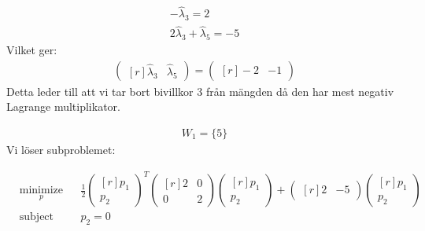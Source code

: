 \begin{equation*}
\begin{aligned}
-\hat{\lambda}_3=2 \\
2\hat{\lambda}_3+\hat{\lambda}_5=-5
\end{aligned}
\end{equation*}
Vilket ger:
\begin{equation*}
\begin{aligned}
  \begin{pmatrix*}[r]
   \hat{\lambda}_3  &
    \hat{\lambda}_5
\end{pmatrix*}=
  \begin{pmatrix*}[r]
   -2  &
    -1
\end{pmatrix*}
\end{aligned}
\end{equation*}
Detta leder till att vi tar bort bivillkor 3 från mängden då den har mest negativ Lagrange multiplikator.

\begin{equation*}
\begin{aligned}
W_1=\{ 5 \}
\end{aligned}
\end{equation*}
Vi löser subproblemet:

\begin{equation*}
\begin{aligned}
& \underset{p}{\text{minimize}}
& & \frac{1}{2}
 \begin{pmatrix*}[r]
   p_1  \\
   p_2 
\end{pmatrix*}^
 {T}
 \begin{pmatrix*}[r]
  2 & 0 \\
  0 & 2
\end{pmatrix*}
  \begin{pmatrix*}[r]
   p_1  \\
   p_2 
\end{pmatrix*}
 +
  \begin{pmatrix*}[r]
   2  &
   -5
\end{pmatrix*} 
  \begin{pmatrix*}[r]
   p_1  \\
   p_2 
\end{pmatrix*} \\
& \text{subject to}
& & p_2= 0  \\
\end{aligned}
\end{equation*}


